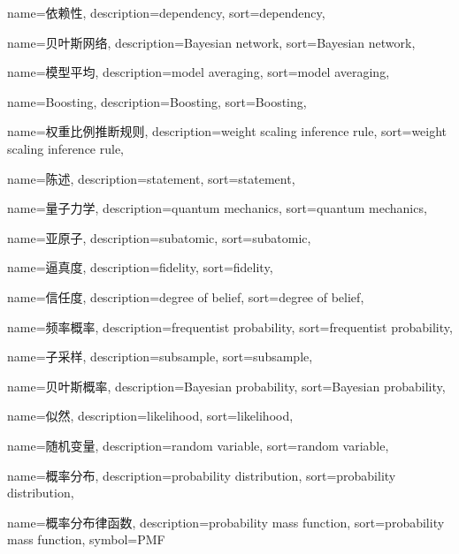 {
  name=依赖性,
  description={dependency},
  sort={dependency},
}

{
  name=贝叶斯网络,
  description={Bayesian network},
  sort={Bayesian network},
}

{
  name=模型平均,
  description={model averaging},
  sort={model averaging},
}

{
  name=Boosting,
  description={Boosting},
  sort={Boosting},
}

{
  name=权重比例推断规则,
  description={weight scaling inference rule},
  sort={weight scaling inference rule},
}

{
  name=陈述,
  description={statement},
  sort={statement},
}

{
  name=量子力学,
  description={quantum mechanics},
  sort={quantum mechanics},
}

{
  name=亚原子,
  description={subatomic},
  sort={subatomic},
}

{
  name=逼真度,
  description={fidelity},
  sort={fidelity},
}

{
  name=信任度,
  description={degree of belief},
  sort={degree of belief},
}

{
  name=频率概率,
  description={frequentist probability},
  sort={frequentist probability},
}

{
  name=子采样,
  description={subsample},
  sort={subsample},
}

{
  name=贝叶斯概率,
  description={Bayesian probability},
  sort={Bayesian probability},
}

{
  name=似然,
  description={likelihood},
  sort={likelihood},
}

{
  name=随机变量,
  description={random variable},
  sort={random variable},
}

{
  name=概率分布,
  description={probability distribution},
  sort={probability distribution},
}

{
  name=概率分布律函数,
  description={probability mass function},
  sort={probability mass function},
  symbol={PMF}
}

